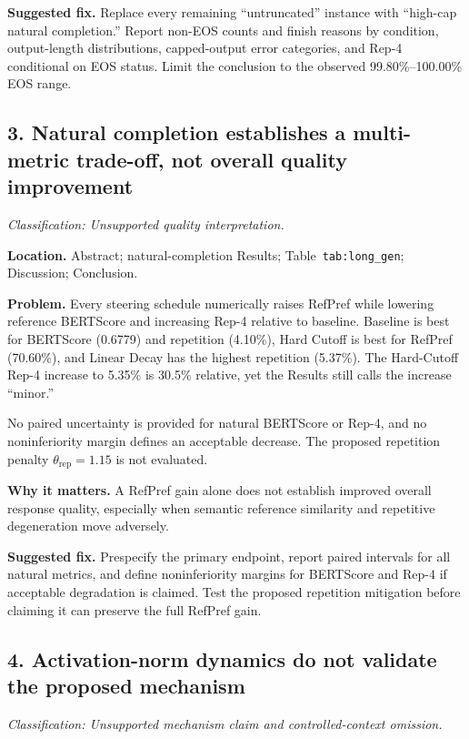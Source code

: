\documentclass[11pt]{article}
\newcommand{\findinglabel}[1]{\textbf{#1}}
\newcommand{\classification}[1]{\textit{Classification: #1.}}
\begin{document}
\findinglabel{Suggested fix.} Replace every remaining ``untruncated'' instance with ``high-cap natural completion.''  Report non-EOS counts and finish reasons by condition, output-length distributions, capped-output error categories, and Rep-4 conditional on EOS status.  Limit the conclusion to the observed 99.80\%--100.00\% EOS range.

\subsection*{3. Natural completion establishes a multi-metric trade-off, not overall quality improvement}

\classification{Unsupported quality interpretation}

\findinglabel{Location.} Abstract; natural-completion Results; Table~\texttt{tab:long\_gen}; Discussion; Conclusion.

\findinglabel{Problem.} Every steering schedule numerically raises RefPref while lowering reference BERTScore and increasing Rep-4 relative to baseline.  Baseline is best for BERTScore (0.6779) and repetition (4.10\%), Hard Cutoff is best for RefPref (70.60\%), and Linear Decay has the highest repetition (5.37\%).  The Hard-Cutoff Rep-4 increase to 5.35\% is 30.5\% relative, yet the Results still calls the increase ``minor.''

No paired uncertainty is provided for natural BERTScore or Rep-4, and no noninferiority margin defines an acceptable decrease.  The proposed repetition penalty $\theta_{\text{rep}}=1.15$ is not evaluated.

\findinglabel{Why it matters.} A RefPref gain alone does not establish improved overall response quality, especially when semantic reference similarity and repetitive degeneration move adversely.

\findinglabel{Suggested fix.} Prespecify the primary endpoint, report paired intervals for all natural metrics, and define noninferiority margins for BERTScore and Rep-4 if acceptable degradation is claimed.  Test the proposed repetition mitigation before claiming it can preserve the full RefPref gain.

\subsection*{4. Activation-norm dynamics do not validate the proposed mechanism}

\classification{Unsupported mechanism claim and controlled-context omission}
\end{document}
